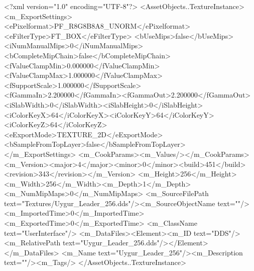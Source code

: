 <?xml version="1.0" encoding="UTF-8"?>
<AssetObjects..TextureInstance>
  <m_ExportSettings>
    <ePixelformat>PF_R8G8B8A8_UNORM</ePixelformat><eFilterType>FT_BOX</eFilterType>
    <bUseMips>false</bUseMips><iNumManualMips>0</iNumManualMips><bCompleteMipChain>false</bCompleteMipChain>
    <fValueClampMin>0.000000</fValueClampMin><fValueClampMax>1.000000</fValueClampMax><fSupportScale>1.000000</fSupportScale>
    <fGammaIn>2.200000</fGammaIn><fGammaOut>2.200000</fGammaOut><iSlabWidth>0</iSlabWidth><iSlabHeight>0</iSlabHeight>
    <iColorKeyX>64</iColorKeyX><iColorKeyY>64</iColorKeyY><iColorKeyZ>64</iColorKeyZ>
    <eExportMode>TEXTURE_2D</eExportMode><bSampleFromTopLayer>false</bSampleFromTopLayer>
  </m_ExportSettings>
  <m_CookParams><m_Values/></m_CookParams>
  <m_Version><major>4</major><minor>0</minor><build>451</build><revision>343</revision></m_Version>
  <m_Height>256</m_Height><m_Width>256</m_Width><m_Depth>1</m_Depth><m_NumMipMaps>0</m_NumMipMaps>
  <m_SourceFilePath text="Textures/Uygur_Leader_256.dds"/><m_SourceObjectName text=""/>
  <m_ImportedTime>0</m_ImportedTime><m_ExportedTime>0</m_ExportedTime>
  <m_ClassName text="UserInterface"/>
  <m_DataFiles><Element><m_ID text="DDS"/><m_RelativePath text="Uygur_Leader_256.dds"/></Element></m_DataFiles>
  <m_Name text="Uygur_Leader_256"/><m_Description text=""/><m_Tags/>
</AssetObjects..TextureInstance>
